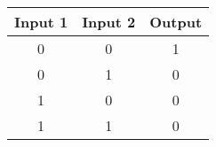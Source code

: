 
\begin{tabular}{ |c|c|c| }
\hline
\rowcolor{gray!60}
	Input 1 & Input 2 & Output \\
	\hline
	0 & 0 & 1 \\
	\hline
	0 & 1 & 0 \\
	\hline
	1 & 0 & 0 \\
	\hline
	1 & 1 & 0 \\
	\hline
\end{tabular}

